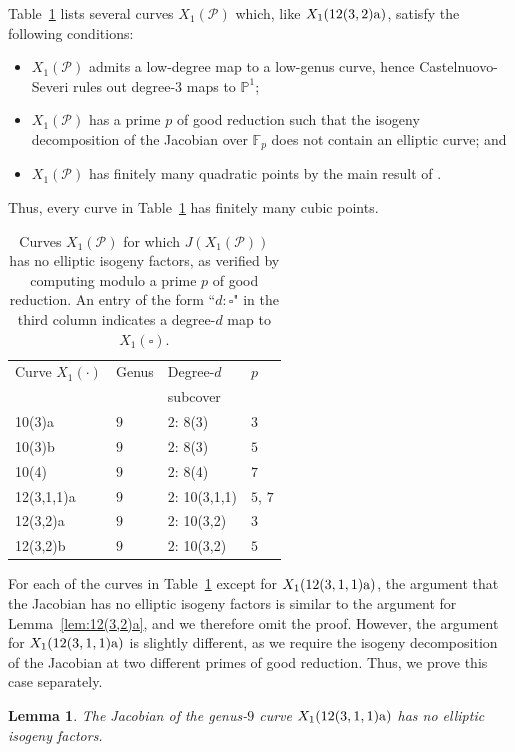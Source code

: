 \documentclass[12pt]{amsart}
\newtheorem{lem}[thm]{Lemma}
\theoremstyle{definition}
\newcommand{\bbF}{\mathbb{F}}
\newcommand{\calP}{\mathcal{P}}
\numberwithin{equation}{section}
\begin{document}
Table~\ref{table:no elliptic factors} lists several curves $X_1(\calP)$ which, like $X_1({\rm 12(3,2)a})$, satisfy the following conditions:
\begin{itemize}
    \item $X_1(\calP)$ admits a low-degree map to a low-genus curve, hence Castelnuovo-Severi rules out degree-$3$ maps to $\mathbb{P}^1$;
    \item $X_1(\calP)$ has a prime $p$ of good reduction such that the isogeny decomposition of the Jacobian over $\bbF_p$ does not contain an elliptic curve; and
    \item $X_1(\calP)$ has finitely many quadratic points by the main result of \cite{doyle/krumm:2024}.
\end{itemize}
Thus, every curve in Table~\ref{table:no elliptic factors} has finitely many cubic points.

\begin{table}
\centering
\begin{tabular}{|l|l|l|l|}
 \hline
 Curve $X_1(\cdot)$ & Genus & Degree-$d$ &  $p$ \\
  & & subcover & \\
 \hline \hline
 10(3)a & $9$ & $2$: 8(3) & $3$\\
 \hline
 10(3)b & $9$ & $2$: 8(3) & $5$\\
 \hline
 10(4) & $9$ & $2$: 8(4) & $7$\\
 \hline
 12(3,1,1)a & $9$ & $2$: 10(3,1,1) & $5$, $7$\\
 \hline
 12(3,2)a & $9$ & $2$: 10(3,2) & $3$ \\
 \hline
 12(3,2)b & $9$ & $2$: 10(3,2) & $5$ \\
 \hline

\end{tabular}
\caption{Curves $X_1(\mathcal{P})$ for which $J(X_1(\calP))$ has no elliptic isogeny factors, as verified by computing modulo a prime $p$ of good reduction. An entry of the form ``$d: \square$" in the third column indicates a degree-$d$ map to $X_1(\square)$.}
\label{table:no elliptic factors}
\end{table}

For each of the curves in Table~\ref{table:no elliptic factors} except for $X_1(\rm 12(3,1,1)a)$, the argument that the Jacobian has no elliptic isogeny factors is similar to the argument for Lemma~\ref{lem:12(3,2)a}, and we therefore omit the proof. However, the argument for $X_1(\rm 12(3,1,1)a)$ is slightly different, as we require the isogeny decomposition of the Jacobian at two different primes of good reduction. Thus, we prove this case separately.
\begin{lem}
    The Jacobian of the genus-$9$ curve $X_1(\rm 12(3,1,1)a)$ has no elliptic isogeny factors.
\end{lem}
\end{document}
